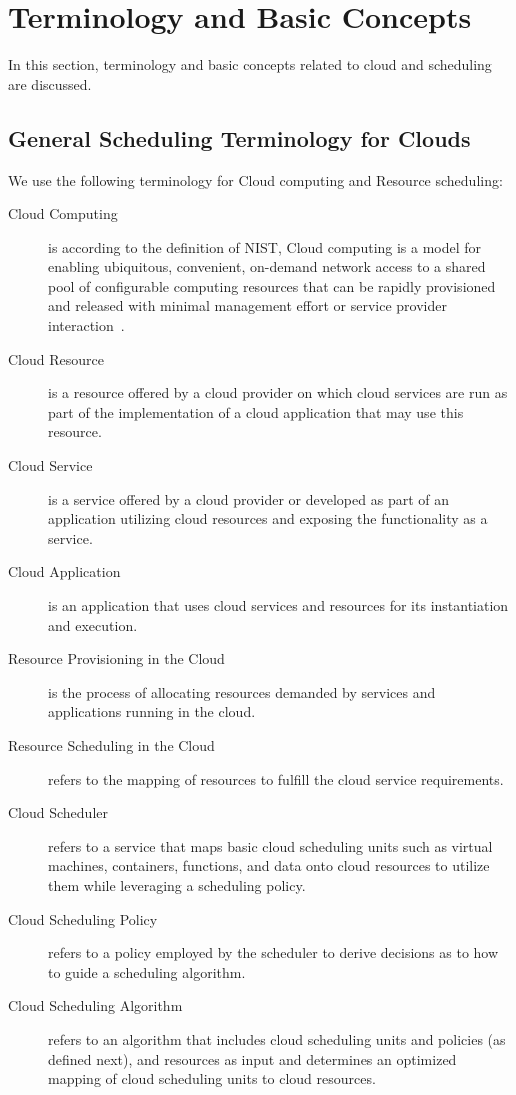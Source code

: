 \documentclass[final,5p,times,twocolumn]{elsarticle}
\begin{document}
\section{Terminology and Basic Concepts}\label{sec:terminology}

In this section, terminology and basic concepts related to cloud and scheduling are discussed.

\subsection{General Scheduling Terminology for Clouds}

We use the following terminology for Cloud computing and Resource scheduling:

\begin{description}

\item[Cloud Computing] is according to the definition of NIST, Cloud computing is a model for enabling ubiquitous, convenient, on-demand network access to a shared pool of configurable computing resources that can be rapidly provisioned and released with minimal management effort or service provider interaction~\cite{mell2011nist}.

\item[Cloud Resource] is a resource offered by a cloud provider on which cloud services are run as part of the implementation of a cloud application that may use this resource.

\item[Cloud Service] is a service offered by a cloud provider or developed as part of an application utilizing cloud resources and exposing the functionality as a service.
 
\item[Cloud Application] is an application that uses cloud services and resources for its instantiation and execution.

\item[Resource Provisioning in the Cloud] is the process of allocating resources demanded by services and applications running in the cloud.
 
\item[Resource Scheduling in the Cloud] refers to the mapping of resources to fulfill the cloud service requirements.

\item[Cloud Scheduler] refers to a service that maps basic cloud scheduling units such as virtual machines, containers, functions, and data onto cloud resources to utilize them while leveraging a scheduling policy. 

\item[Cloud Scheduling Policy] refers to a policy employed by the scheduler to derive decisions as to how to guide a scheduling algorithm.

\item[Cloud Scheduling Algorithm] refers to an algorithm that includes cloud scheduling units and policies (as defined next), and resources as input and determines an optimized mapping of cloud scheduling units to cloud resources.
 
\end{description}
\end{document}
